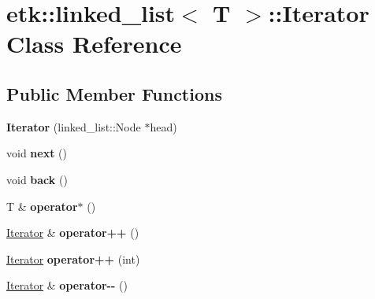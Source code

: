 \hypertarget{classetk_1_1linked__list_1_1_iterator}{\section{etk\-:\-:linked\-\_\-list$<$ T $>$\-:\-:Iterator Class Reference}
\label{classetk_1_1linked__list_1_1_iterator}
}
\subsection*{Public Member Functions}
\begin{DoxyCompactItemize}
\item 
\hypertarget{classetk_1_1linked__list_1_1_iterator_a192d746a38a9d22f8f0bf1cb6eda56dc}{{\bfseries Iterator} (linked\-\_\-list\-::\-Node $\ast$head)}\label{classetk_1_1linked__list_1_1_iterator_a192d746a38a9d22f8f0bf1cb6eda56dc}

\item 
\hypertarget{classetk_1_1linked__list_1_1_iterator_ae5c9015b68959ebc34ac6cca8361a355}{void {\bfseries next} ()}\label{classetk_1_1linked__list_1_1_iterator_ae5c9015b68959ebc34ac6cca8361a355}

\item 
\hypertarget{classetk_1_1linked__list_1_1_iterator_a8a2810d48f6e13f6d25621f0cebac155}{void {\bfseries back} ()}\label{classetk_1_1linked__list_1_1_iterator_a8a2810d48f6e13f6d25621f0cebac155}

\item 
\hypertarget{classetk_1_1linked__list_1_1_iterator_a800ea9818e95b7a47bbf9dd7e6c1a2c3}{T \& {\bfseries operator$\ast$} ()}\label{classetk_1_1linked__list_1_1_iterator_a800ea9818e95b7a47bbf9dd7e6c1a2c3}

\item 
\hypertarget{classetk_1_1linked__list_1_1_iterator_a6818cc1e33d0f6e72251b6a5308c0a4c}{\hyperlink{classetk_1_1linked__list_1_1_iterator}{Iterator} \& {\bfseries operator++} ()}\label{classetk_1_1linked__list_1_1_iterator_a6818cc1e33d0f6e72251b6a5308c0a4c}

\item 
\hypertarget{classetk_1_1linked__list_1_1_iterator_af1f42e736b417156a73f50473cbf5636}{\hyperlink{classetk_1_1linked__list_1_1_iterator}{Iterator} {\bfseries operator++} (int)}\label{classetk_1_1linked__list_1_1_iterator_af1f42e736b417156a73f50473cbf5636}

\item 
\hypertarget{classetk_1_1linked__list_1_1_iterator_abdd3128610e4c11027bb3bf96939231c}{\hyperlink{classetk_1_1linked__list_1_1_iterator}{Iterator} \& {\bfseries operator-\/-\/} ()}\label{classetk_1_1linked__list_1_1_iterator_abdd3128610e4c11027bb3bf96939231c}


\end{DoxyCompactItemize}
